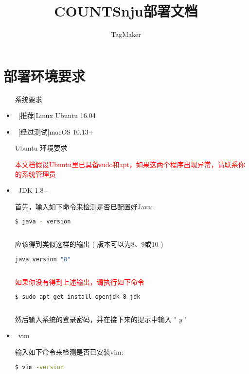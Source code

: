 \documentclass{ctexart}
\author{TagMaker}
\title{COUNTSnju部署文档}
\begin{document}
\maketitle
\newpage
\tableofcontents
\newpage
\section{部署环境要求}
\begin{itemize}
        \item [系统要求]
        \
        

        \item\  [推荐]Linux Ubuntu 16.04

        \item\  [经过测试]macOS 10.13+

        \item[Ubuntu 环境要求]
        \

        \textcolor{red}{本文档假设Ubuntu里已具备sudo和apt，如果这两个程序出现异常，请联系你的系统管理员}
        
        \item\ JDK 1.8+

        首先，输入如下命令来检测是否已配置好Java:

        \begin{lstlisting}[language=bash]
         $ java - version
                
        \end{lstlisting}

        应该得到类似这样的输出 ( 版本可以为8、9或10 )

        \begin{lstlisting}[language=bash]
         java version "8"
                
        \end{lstlisting}
        \textcolor{red}{如果你没有得到上述输出，请执行如下命令}
        \begin{lstlisting}[language=bash]
         $ sudo apt-get install openjdk-8-jdk
                       
        \end{lstlisting}
        然后输入系统的登录密码，并在接下来的提示中输入 " \emph{y} "

        \item\ vim

        输入如下命令来检测是否已安装vim:

        \begin{lstlisting}[language=bash]
         $ vim -version
                

\end{lstlisting}
\end{itemize}
\end{document}
